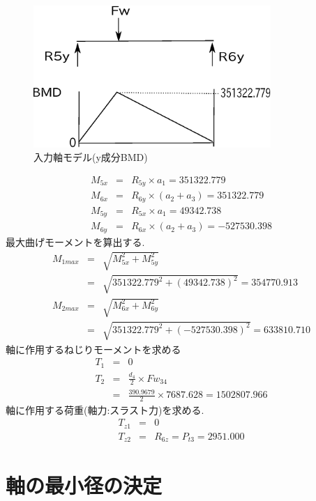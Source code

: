 \documentclass[a4j,twoside,openright,11pt]{jreport}
\begin{document}
\begin{figure}[htbp]
\begin{center}
\includegraphics[width=9cm]{jiku332.eps}
\end{center}
\caption{入力軸モデル(y成分BMD)}
\end{figure}
\begin{eqnarray}
M_{5x} &=& R_{5y} \times a_1=351322.779\\
M_{6x} &=& R_{6y} \times (a_2+a_3)=351322.779\\
M_{5y} &=& R_{5x} \times a_1=49342.738\\
M_{6y} &=& R_{6x} \times (a_2+a_3)=-527530.398
\end{eqnarray}
最大曲げモーメントを算出する.
\begin{eqnarray}
M_{1max} &=& \sqrt {M_{5x}^2+M_{5y}^2}\\
         &=& \sqrt {351322.779^2+(49342.738)^2}=354770.913\\
M_{2max} &=& \sqrt {M_{6x}^2+M_{6y}^2}\\
         &=& \sqrt {351322.779^2+(-527530.398)^2}=633810.710
\end{eqnarray}
軸に作用するねじりモーメントを求める
\begin{eqnarray}
T_{1} &=& 0\\
T_{2} &=& \frac{d_4}{2} \times Fw_{34}\\
      &=& \frac{390.9679}{2} \times 7687.628 = 1502807.966
\end{eqnarray}
軸に作用する荷重(軸力:スラスト力)を求める.
\begin{eqnarray}
T_{z1} &=& 0\\
T_{z2} &=& R_{6z} = P_{t3} = 2951.000
\end{eqnarray}

\section{軸の最小径の決定}
\end{document}

